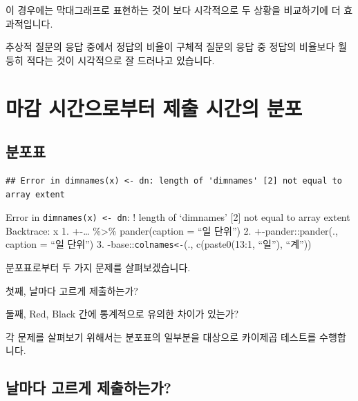 \documentclass[
]{book}
\begin{document}
이 경우에는 막대그래프로 표현하는 것이 보다 시각적으로 두 상황을 비교하기에 더 효과적입니다.

추상적 질문의 응답 중에서 정답의 비율이 구체적 질문의 응답 중 정답의 비율보다 월등히 적다는 것이 시각적으로 잘 드러나고 있습니다.

\section{마감 시간으로부터 제출 시간의 분포}\label{uxb9c8uxac10-uxc2dcuxac04uxc73cuxb85cuxbd80uxd130-uxc81cuxcd9c-uxc2dcuxac04uxc758-uxbd84uxd3ec-6}

\subsection{분포표}\label{uxbd84uxd3ecuxd45c-7}

\begin{verbatim}
## Error in dimnames(x) <- dn: length of 'dimnames' [2] not equal to array extent
\end{verbatim}

Error in \texttt{dimnames(x)\ \textless{}-\ dn}:
! length of `dimnames' {[}2{]} not equal to array extent
Backtrace:
x
1. +-\ldots{} \%\textgreater\% pander(caption = ``일 단위'')
2. +-pander::pander(., caption = ``일 단위'')
3. -base::\texttt{colnames\textless{}-}(., c(paste0(13:1, ``일''), ``계''))

분포표로부터 두 가지 문제를 살펴보겠습니다.

첫째, 날마다 고르게 제출하는가?

둘째, Red, Black 간에 통계적으로 유의한 차이가 있는가?

각 문제를 살펴보기 위해서는 분포표의 일부분을 대상으로 카이제곱 테스트를 수행합니다.

\subsection{날마다 고르게 제출하는가?}\label{uxb0a0uxb9c8uxb2e4-uxace0uxb974uxac8c-uxc81cuxcd9cuxd558uxb294uxac00-6}
\end{document}
